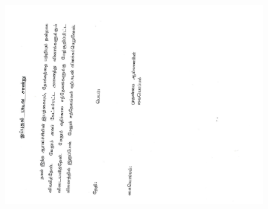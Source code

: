 \begin{figure}
\includegraphics[width=\linewidth,height=\textheight,keepaspectratio]{Appendices/TamilIC3.pdf}
\end{figure}